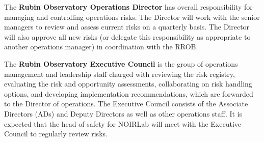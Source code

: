 The \textbf{Rubin Observatory Operations Director} has overall responsibility for managing and controlling operations risks.
The Director will work with the senior managers to review and assess current risks on a quarterly basis.
The Director will also approve all new risks (or delegate this responsibility as appropriate to another operations manager) in coordination with the RROB.

The \textbf{Rubin Observatory Executive Council} is the group of operations management and leadership staff charged with reviewing the risk registry, evaluating the risk and opportunity assessments, collaborating on risk handling options, and developing implementation recommendations, which are forwarded to the Director of operations.
The Executive Council consists of the Associate Directors (ADs) and Deputy Directors as well as other operations staff.
It is expected that the head of safety for NOIRLab will meet with the Executive Council to regularly review risks.
